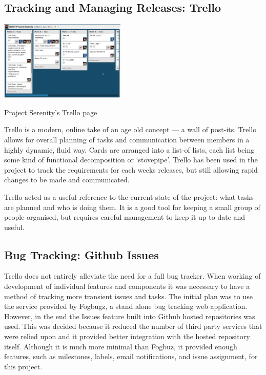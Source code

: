 \subsection{Tracking and Managing Releases: Trello}

\begin{marginfigure}
	\includegraphics[width=6cm]{res/trello.png}
	\caption[Trello]{Project Serenity's Trello page}
	\label{fig:trello}
\end{marginfigure}

Trello is a modern, online take of an age old concept --- a wall of post-its. Trello allows for overall planning of tasks and communication between members in a highly dynamic, fluid way. Cards are arranged into a list-of lists, each list being some kind of functional decomposition or `stovepipe'. Trello has been used in the project to track the requirements for each weeks releases, but still allowing rapid changes to be made and communicated.

Trello acted as a useful reference to the current state of the project: what tasks are planned and who is doing them.
It is a good tool for keeping a small group of people organised, but requires careful management to keep it
up to date and useful.

\subsection{Bug Tracking: Github Issues}

Trello does not entirely alleviate the need for a full bug tracker. When working of development of
individual features and components it was necessary to have a method of tracking more transient issues
and tasks. The initial plan was to use the service provided by Fogbugz, a stand alone bug tracking
web application. However, in the end the Issues feature built into Github hosted repositories was
used. This was decided because it reduced the number of third party services that were relied upon
and it provided better integration with the hosted repository itself. Although it is much more minimal
than Fogbuz, it provided enough features, such as milestones, labels, email notifications, and
issue assignment, for this project.

